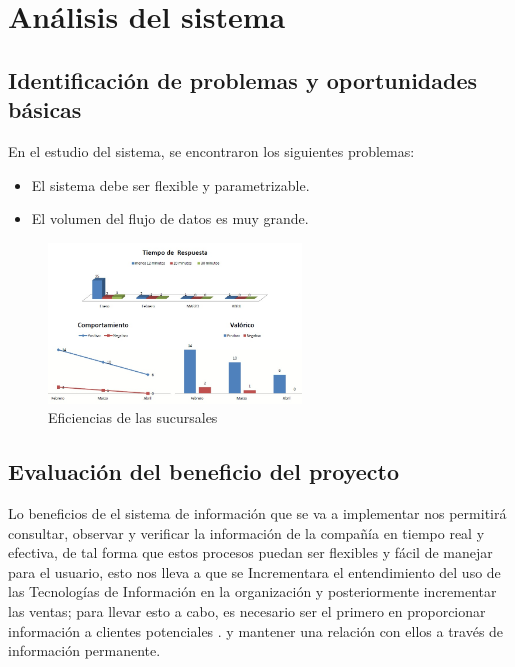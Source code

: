 \chapter{An\'alisis del sistema}
\section{Identificaci\'on de problemas y oportunidades b\'asicas}
En el estudio del sistema, se encontraron los siguientes problemas:%
\\%
\begin{itemize}
	\item El sistema debe ser flexible y parametrizable.%
	\item El volumen del flujo de datos es muy grande.%
	
	
\end{itemize}%
%
\begin{figure}[htbp]
	\centering
		\includegraphics[width=0.60\textwidth]{images/Eficienciadelasucursal.jpg}
	\caption{Eficiencias de las sucursales}
	\label{fig:eficienciasucursales}
\end{figure}%
%
\section{Evaluaci\'on del beneficio del proyecto}
Lo beneficios de el sistema de informaci\'on que se va a implementar nos permitir\'a consultar, observar y verificar la informaci\'on de la compa\~n\'ia en tiempo real y efectiva, de tal forma que estos procesos puedan ser flexibles y f\'acil de manejar para el usuario, esto nos lleva a que se Incrementara  el entendimiento del uso de las Tecnolog\'ias de Informaci\'on en la organizaci\'on y posteriormente  incrementar las ventas; para llevar esto a cabo, es necesario ser el primero en proporcionar informaci\'on a clientes potenciales . y mantener una relaci\'on con ellos a trav\'es de informaci\'on permanente.%
%
